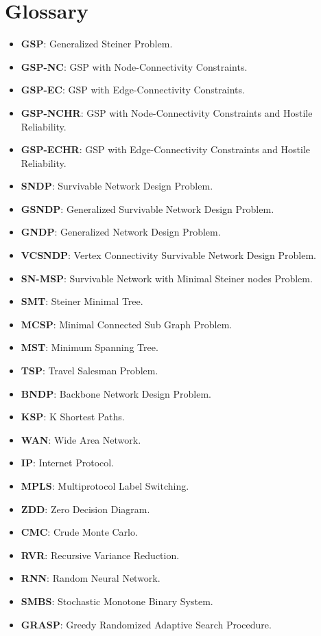 \chapter*{Glossary}
\begin{itemize}
\item \textbf{GSP}: Generalized Steiner Problem.
\item \textbf{GSP-NC}: GSP with Node-Connectivity Constraints.
\item \textbf{GSP-EC}: GSP with Edge-Connectivity Constraints.
\item \textbf{GSP-NCHR}: GSP with Node-Connectivity Constraints and Hostile Reliability.
\item \textbf{GSP-ECHR}: GSP with Edge-Connectivity Constraints and Hostile Reliability.
\item \textbf{SNDP}: Survivable Network Design Problem.
\item \textbf{GSNDP}: Generalized Survivable Network Design Problem.
\item \textbf{GNDP}: Generalized Network Design Problem.
\item \textbf{VCSNDP}: Vertex Connectivity Survivable Network Design Problem.
\item \textbf{SN-MSP}: Survivable Network with Minimal Steiner nodes Problem.
\item \textbf{SMT}: Steiner Minimal Tree.
\item \textbf{MCSP}: Minimal Connected Sub Graph Problem.
\item \textbf{MST}: Minimum Spanning Tree.
\item \textbf{TSP}: Travel Salesman Problem.
\item \textbf{BNDP}: Backbone Network Design Problem.
\item \textbf{KSP}: K Shortest Paths.
\item \textbf{WAN}: Wide Area Network.
\item \textbf{IP}: Internet Protocol.
\item \textbf{MPLS}: Multiprotocol Label Switching.
\item \textbf{ZDD}: Zero Decision Diagram.
\item \textbf{CMC}: Crude Monte Carlo.
\item \textbf{RVR}: Recursive Variance Reduction.
\item \textbf{RNN}: Random Neural Network.
\item \textbf{SMBS}: Stochastic Monotone Binary System.
\item \textbf{GRASP}: Greedy Randomized Adaptive Search Procedure.

\end{itemize}
